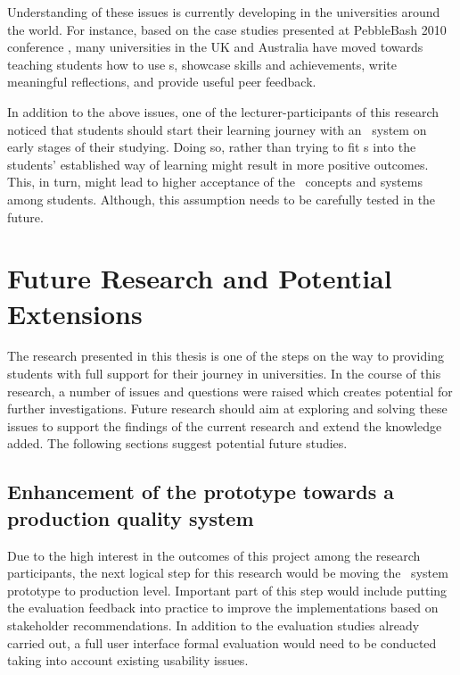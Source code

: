 Understanding of these issues is currently developing in the universities
around the world. For instance, based on the case studies presented at
PebbleBash 2010 conference \citep{PebbleLearningLtd2010a}, many universities in
the UK and Australia have moved towards teaching students how to use \ep s,
showcase skills and achievements, write meaningful reflections, and provide
useful peer feedback.

In addition to the above issues, one of the lecturer-participants of this
research noticed that students should start their learning journey with an
\ep~system on early stages of their studying. Doing so, rather than trying to
fit \ep s into the students' established way of learning might result in more
positive outcomes. This, in turn, might lead to higher acceptance of the
\ep~concepts and systems among students. Although, this assumption needs to
be carefully tested in the future.

\section{Future Research and Potential Extensions}
The research presented in this thesis is one of the steps on the way to
providing students with full support for their \LLLs journey in universities. In
the course of this research, a number of issues and questions were raised which
creates potential for further investigations. Future research should aim at
exploring and solving these issues to support the findings of the current
research and extend the knowledge added. The following sections suggest
potential future studies.

\subsection[Enhancement of the prototype]{Enhancement of the prototype towards a
production quality system} 
Due to the high interest in the outcomes of this project among the research
participants, the next logical step for this research would be moving the
\ep~system prototype to production level. Important part of this step would
include putting the evaluation feedback into practice to improve the
implementations based on stakeholder recommendations. In addition to the
evaluation studies already carried out, a full user interface formal evaluation
would need to be conducted taking into account existing usability issues.


